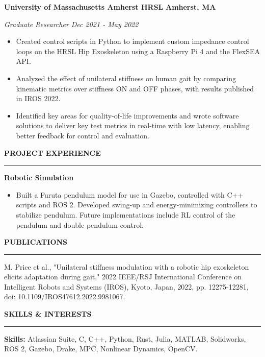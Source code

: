 \documentclass[11pt]{article}
\newcommand{\sectionheading}[1]{%
  \vspace{1em}%
  {\large\textbf{\MakeUppercase{#1}}}\\[-0.5em]%
  \rule{\textwidth}{0.5pt}%
  \vspace{0.5em}%
}
\begin{document}
\textbf{University of Massachusetts Amherst HRSL} \textbf{Amherst, MA}

\emph{Graduate Researcher Dec 2021 - May 2022}

\begin{itemize}
\item
  Created control scripts in Python to implement custom impedance
  control loops on the HRSL Hip Exoskeleton using a Raspberry Pi 4 and
  the FlexSEA API.
\item
  Analyzed the effect of unilateral stiffness on human gait by comparing
  kinematic metrics over stiffness ON and OFF phases, with results
  published in IROS 2022.
\item
  Identified key areas for quality-of-life improvements and wrote
  software solutions to deliver key test metrics in real-time with low
  latency, enabling better feedback for control and evaluation.
\end{itemize}

\sectionheading{Project Experience}

\textbf{Robotic Simulation}

\begin{itemize}
\item
  Built a Furuta pendulum model for use in Gazebo, controlled with C++
  scripts and ROS 2. Developed swing-up and energy-minimizing
  controllers to stabilize pendulum. Future implementations include RL
  control of the pendulum and double pendulum control.
\end{itemize}

\sectionheading{Publications}

M. Price et al., "Unilateral stiffness modulation with a robotic hip
exoskeleton elicits adaptation during gait," 2022 IEEE/RSJ International
Conference on Intelligent Robots and Systems (IROS), Kyoto, Japan, 2022,
pp. 12275-12281, doi: 10.1109/IROS47612.2022.9981067.

\sectionheading{Skills \& Interests}

\textbf{Skills:} Atlassian Suite, C, C++, Python, Rust, Julia, MATLAB,
Solidworks, ROS 2, Gazebo, Drake, MPC, Nonlinear Dynamics, OpenCV.
\end{document}
